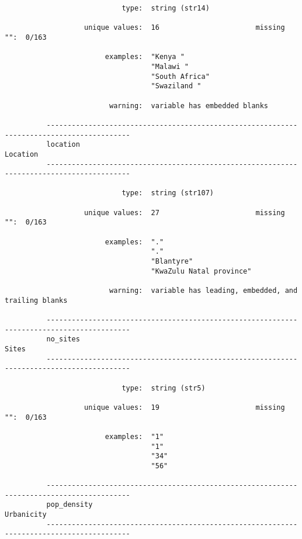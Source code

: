 \documentclass{article}
\begin{document}
\begin{verbatim}
                            type:  string (str14)
          
                   unique values:  16                       missing "":  0/163
          
                        examples:  "Kenya "
                                   "Malawi "
                                   "South Africa"
                                   "Swaziland "
          
                         warning:  variable has embedded blanks
          
          ------------------------------------------------------------------------------------------
          location                                                                          Location
          ------------------------------------------------------------------------------------------
          
                            type:  string (str107)
          
                   unique values:  27                       missing "":  0/163
          
                        examples:  "."
                                   "."
                                   "Blantyre"
                                   "KwaZulu Natal province"
          
                         warning:  variable has leading, embedded, and trailing blanks
          
          ------------------------------------------------------------------------------------------
          no_sites                                                                             Sites
          ------------------------------------------------------------------------------------------
          
                            type:  string (str5)
          
                   unique values:  19                       missing "":  0/163
          
                        examples:  "1"
                                   "1"
                                   "34"
                                   "56"
          
          ------------------------------------------------------------------------------------------
          pop_density                                                                     Urbanicity
          ------------------------------------------------------------------------------------------
          

\end{verbatim}
\end{document}
